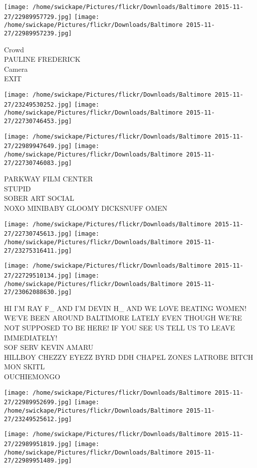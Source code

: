 \documentclass[10pt,letterpaper]{article}
\begin{document}
\texttt{[image: /home/swickape/Pictures/flickr/Downloads/Baltimore 2015-11-27/22989957729.jpg]}
\texttt{[image: /home/swickape/Pictures/flickr/Downloads/Baltimore 2015-11-27/22989957239.jpg]}

Crowd\\
PAULINE FREDERICK\\
Camera\\
EXIT
\pagebreak

\texttt{[image: /home/swickape/Pictures/flickr/Downloads/Baltimore 2015-11-27/23249530252.jpg]}
\texttt{[image: /home/swickape/Pictures/flickr/Downloads/Baltimore 2015-11-27/22730746453.jpg]}

\texttt{[image: /home/swickape/Pictures/flickr/Downloads/Baltimore 2015-11-27/22989947649.jpg]}
\texttt{[image: /home/swickape/Pictures/flickr/Downloads/Baltimore 2015-11-27/22730746083.jpg]}

PARKWAY FILM CENTER\\
STUPID\\
SOBER ART SOCIAL\\
NOXO MINIBABY GLOOMY DICKSNUFF OMEN
\pagebreak

\texttt{[image: /home/swickape/Pictures/flickr/Downloads/Baltimore 2015-11-27/22730745613.jpg]}
\texttt{[image: /home/swickape/Pictures/flickr/Downloads/Baltimore 2015-11-27/23275316411.jpg]}

\texttt{[image: /home/swickape/Pictures/flickr/Downloads/Baltimore 2015-11-27/22729510134.jpg]}
\texttt{[image: /home/swickape/Pictures/flickr/Downloads/Baltimore 2015-11-27/23062088630.jpg]}

HI I'M RAY F\_ AND I'M DEVIN H\_ AND WE LOVE BEATING WOMEN!  WE'VE BEEN AROUND BALTIMORE LATELY EVEN THOUGH WE'RE NOT SUPPOSED TO BE HERE!  IF YOU SEE US TELL US TO LEAVE IMMEDIATELY!\\
SOF SERV KEVIN AMARU\\
HILLBOY CHEZZY EYEZZ BYRD DDH CHAPEL ZONES LATROBE BITCH MON SKITL\\
OUCHIEMONGO
\pagebreak

\texttt{[image: /home/swickape/Pictures/flickr/Downloads/Baltimore 2015-11-27/22989952699.jpg]}
\texttt{[image: /home/swickape/Pictures/flickr/Downloads/Baltimore 2015-11-27/23249525612.jpg]}

\texttt{[image: /home/swickape/Pictures/flickr/Downloads/Baltimore 2015-11-27/22989951819.jpg]}
\texttt{[image: /home/swickape/Pictures/flickr/Downloads/Baltimore 2015-11-27/22989951489.jpg]}
\end{document}
